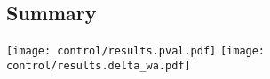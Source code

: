 \subsection{Summary}
\begin{center}
    \texttt{[image: control/results.pval.pdf]}
    \texttt{[image: control/results.delta\_wa.pdf]}
\end{center}
